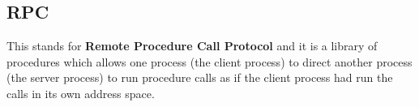 \documentclass[12pt]{article}
\theoremstyle{definition}
\theoremstyle{definition}
\begin{document}
    \subsection{RPC}
        This stands for \textbf{Remote Procedure Call Protocol} and it is
        a library of procedures which allows one process (the client process)
        to direct another process (the server process) to run procedure calls
        as if the client process had run the calls in its own address space.                                                                                
\end{document}
